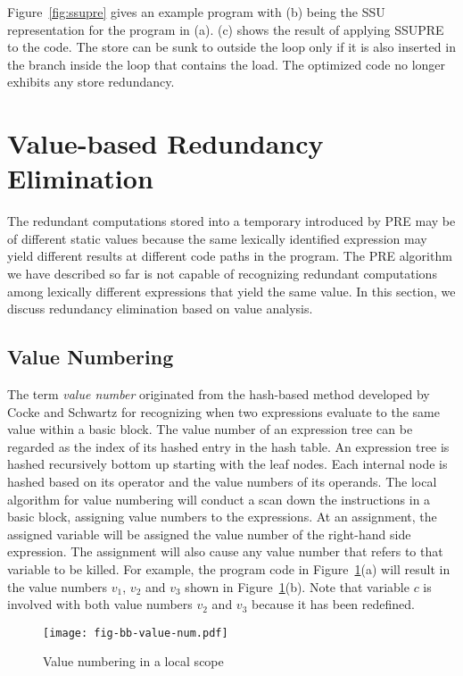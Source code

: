 Figure~\ref{fig:ssupre} gives an example program with (b) being the SSU representation for the program in (a). 
(c) shows the result of applying SSUPRE to the code. 
The store can be sunk to outside the loop only if it is also inserted in the branch inside the loop that contains the load. 
The optimized code no longer exhibits any store redundancy.

\section{Value-based Redundancy Elimination}
\label{section:Part3:Pre_not_helped:SemanticPRE}

The redundant computations stored into a temporary introduced by PRE may be of different static values because the same lexically identified expression may yield different results at different code paths in the program. 
The PRE algorithm we have described so far is not capable of recognizing redundant computations among lexically different expressions that yield the same value. 
In this section, we discuss redundancy elimination based on value analysis.

\subsection{Value Numbering}
\label{sec:pre_not_helped:GVN}
 The term \emph{value number} originated from the hash-based method developed by Cocke and Schwartz for recognizing when two expressions evaluate to the same value within a basic block. 
The value number of an expression tree can be regarded as the index of its hashed entry in the hash table. 
An expression tree is hashed recursively bottom up starting with the leaf nodes. 
Each internal node is hashed based on its operator and the value numbers of its operands. 
The local algorithm for value numbering will conduct a scan down the instructions in a basic block, assigning value numbers to the expressions. 
At an assignment, the assigned variable will be assigned the value number of the right-hand side expression. 
The assignment will also cause any value number that refers to that variable to be killed. 
For example, the program code in Figure~\ref{fig:bb-value-num}(a) will result in the value numbers $v_1$, $v_2$ and $v_3$ shown in Figure~\ref{fig:bb-value-num}(b). 
Note that variable $c$ is involved with both value numbers $v_2$ and $v_3$ because it has been redefined.

\begin{figure}[t]
\centering
\texttt{[image: fig-bb-value-num.pdf]}
\caption{Value numbering in a local scope}
\label{fig:bb-value-num}
\end{figure}

